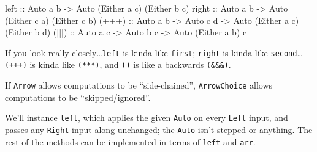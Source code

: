 \documentclass[]{article}
\newenvironment{Shaded}{}{}
\newcommand{\CommentTok}[1]{\textcolor[rgb]{0.38,0.63,0.69}{\textit{#1}}}
\newcommand{\DataTypeTok}[1]{\textcolor[rgb]{0.56,0.13,0.00}{#1}}
\newcommand{\KeywordTok}[1]{\textcolor[rgb]{0.00,0.44,0.13}{\textbf{#1}}}
\newcommand{\NormalTok}[1]{#1}
\newcommand{\OperatorTok}[1]{\textcolor[rgb]{0.40,0.40,0.40}{#1}}
\newcommand{\OtherTok}[1]{\textcolor[rgb]{0.00,0.44,0.13}{#1}}
\begin{document}
\begin{Shaded}
\begin{Highlighting}[]
\OtherTok{left  ::} \DataTypeTok{Auto}\NormalTok{ a b }\OtherTok{{-}\textgreater{}} \DataTypeTok{Auto}\NormalTok{ (}\DataTypeTok{Either}\NormalTok{ a c) (}\DataTypeTok{Either}\NormalTok{ b c)}
\OtherTok{right ::} \DataTypeTok{Auto}\NormalTok{ a b }\OtherTok{{-}\textgreater{}} \DataTypeTok{Auto}\NormalTok{ (}\DataTypeTok{Either}\NormalTok{ c a) (}\DataTypeTok{Either}\NormalTok{ c b)}
\OtherTok{(+++) ::} \DataTypeTok{Auto}\NormalTok{ a b }\OtherTok{{-}\textgreater{}} \DataTypeTok{Auto}\NormalTok{ c d }\OtherTok{{-}\textgreater{}} \DataTypeTok{Auto}\NormalTok{ (}\DataTypeTok{Either}\NormalTok{ a c) (}\DataTypeTok{Either}\NormalTok{ b d)}
\OtherTok{(|||) ::} \DataTypeTok{Auto}\NormalTok{ a c }\OtherTok{{-}\textgreater{}} \DataTypeTok{Auto}\NormalTok{ b c }\OtherTok{{-}\textgreater{}} \DataTypeTok{Auto}\NormalTok{ (}\DataTypeTok{Either}\NormalTok{ a b) c}
\end{Highlighting}
\end{Shaded}

If you look really closely\ldots{}\texttt{left} is kinda like \texttt{first};
\texttt{right} is kinda like \texttt{second}\ldots{}\texttt{(+++)} is kinda like
\texttt{(***)}, and \texttt{(\textbar{}\textbar{}\textbar{})} is like a
backwards \texttt{(\&\&\&)}.

If \texttt{Arrow} allows computations to be ``side-chained'',
\texttt{ArrowChoice} allows computations to be ``skipped/ignored''.

We'll instance \texttt{left}, which applies the given \texttt{Auto} on every
\texttt{Left} input, and passes any \texttt{Right} input along unchanged; the
\texttt{Auto} isn't stepped or anything. The rest of the methods can be
implemented in terms of \texttt{left} and \texttt{arr}.

\begin{Shaded}
\end{Shaded}
\end{document}
